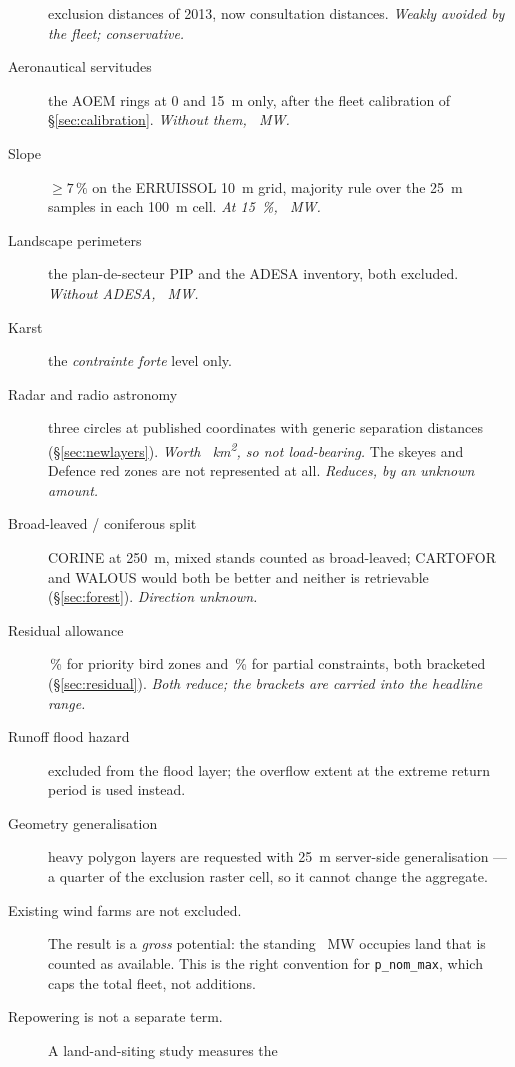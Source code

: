 \documentclass[11pt,a4paper]{article}
\begin{document}
\begin{description}
    exclusion distances of 2013, now consultation distances. \emph{Weakly
    avoided by the fleet; conservative.}
  \item[Aeronautical servitudes] the AOEM rings at 0 and \SI{15}{\metre} only,
    after the fleet calibration of §\ref{sec:calibration}. \emph{Without them,
    \SensNoAviationMW{}~MW.}
  \item[Slope] $\geq 7\,\%$ on the ERRUISSOL \SI{10}{\metre} grid, majority rule
    over the \SI{25}{\metre} samples in each \SI{100}{\metre} cell. \emph{At
    \SI{15}{\percent}, \SensSlopeFifteenMW{}~MW.}
  \item[Landscape perimeters] the plan-de-secteur PIP and the ADESA inventory,
    both excluded. \emph{Without ADESA, \SensNoAdesaMW{}~MW.}
  \item[Karst] the \emph{contrainte forte} level only.
  \item[Radar and radio astronomy] three circles at published coordinates with
    generic separation distances (§\ref{sec:newlayers}). \emph{Worth
    \ServRadarRemoved{}~\si{\square\kilo\metre}, so not load-bearing.} The skeyes
    and Defence red zones are not represented at all. \emph{Reduces, by an
    unknown amount.}
  \item[Broad-leaved / coniferous split] CORINE at \SI{250}{\metre}, mixed
    stands counted as broad-leaved; CARTOFOR and WALOUS would both be better and
    neither is retrievable (§\ref{sec:forest}). \emph{Direction unknown.}
  \item[Residual allowance] \ResOrnithology{}\,\% for priority bird zones and
    \ResPartial{}\,\% for partial constraints, both bracketed
    (§\ref{sec:residual}). \emph{Both reduce; the brackets are carried into the
    headline range.}
  \item[Runoff flood hazard] excluded from the flood layer; the overflow extent
    at the extreme return period is used instead.
  \item[Geometry generalisation] heavy polygon layers are requested with
    \SI{25}{\metre} server-side generalisation --- a quarter of the exclusion
    raster cell, so it cannot change the aggregate.
  \item[Existing wind farms are not excluded.] The result is a \emph{gross}
    potential: the standing \Installed{}~MW occupies land that is counted as
    available. This is the right convention for \texttt{p\_nom\_max}, which caps
    the total fleet, not additions.
  \item[Repowering is not a separate term.] A land-and-siting study measures the

\end{description}
\end{document}
